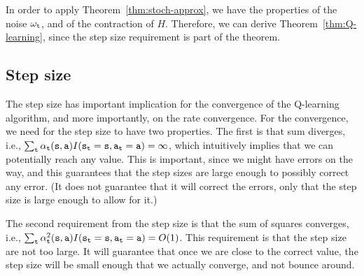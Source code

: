 In order to apply Theorem~\ref{thm:stoch-approx}, we have the
properties of the noise $\omega_{\tt t}$, and of the contraction of
$H$. Therefore, we can derive Theorem~\ref{thm:Q-learning}, since
the step size requirement is part of the theorem.

\subsection{Step size}

The step size has important implication for the convergence of the
Q-learning algorithm, and more importantly, on the rate convergence.
For the convergence, we need for the step size to have two
properties. The first is that sum diverges, i.e., $\sum_{\tt t}
\alpha_{\tt t}({\tt s},{\tt a})
I({\tt s}_{\tt t}={\tt s},{\tt a}_{\tt t}={\tt a})=\infty $, which
intuitively implies that we can potentially reach any value. This is
important, since we might have errors on the way, and this
guarantees that the step sizes are large enough to possibly
correct any error. (It does not guarantee that it will correct the
errors, only that the step size is large enough to allow for it.)

The second requirement from the step size is that the sum of squares
converges, i.e., $\sum_{\tt t} \alpha_{\tt t}^2({\tt s},{\tt a})
I({\tt s}_{\tt t}={\tt s},{\tt a}_{\tt t}={\tt a})=O(1)$. This
requirement is that the step size are not too large. It will
guarantee that once we are close to the correct value, the step size
will be small enough that we actually converge, and not bounce
around.

